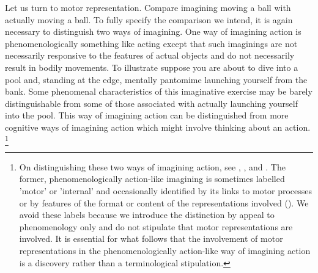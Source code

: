 \documentclass[12pt,\papersize]{extarticle}
\begin{document}
Let us turn to motor representation. Compare imagining moving a ball with actually moving a ball.  To fully specify the comparison we intend, it is again necessary to distinguish two ways of imagining. One way of imagining action is phenomenologically something like acting except that such imaginings are not necessarily responsive to the features of actual objects and do not necessarily result in bodily movements. To illustrate suppose you are about to dive into a pool and, standing at the edge, mentally pantomime launching yourself from the bank. Some phenomenal characteristics of this imaginative exercise may be barely distinguishable from some of those associated with actually launching yourself into the pool. This way of imagining action can be distinguished from more cognitive ways of imagining action which might involve thinking about an action.%
\footnote{
On distinguishing these two ways of imagining action, see \citet[p.\ 161]{currie:1997_mental}, \citet[p.\ 727]{jeannerod:1995_mental}, and \citet[p.\ 638-9]{kosslyn:2001_neural}. The former, phenomenologically action-like imagining is sometimes labelled 'motor' or 'internal' and occasionally identified by its links to motor processes or by features of the format or content of the representations involved (\citealp[p.\ 1400]{annett:1995_motor}). We avoid these labels because we introduce the distinction by appeal to phenomenology only and do not stipulate that motor representations are involved. It is essential for what follows that the involvement of motor representations in the phenomenologically action-like way of imagining action is a discovery rather than a terminological stipulation.}
%
\end{document}
